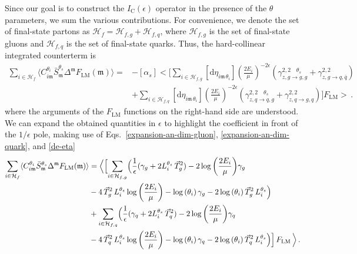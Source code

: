 \documentclass[a4paper, 12pt]{book}
\newcommand{\um}{\mathfrak{m}}
\begin{document}
Since our goal is to construct the $I_{\mathrm{C}}(\epsilon)$ operator in the presence of the $\theta$ parameters, we sum the various contributions. For convenience, we denote the set of final-state partons as $\mathcal{H}_f = \mathcal{H}_{f,g} + \mathcal{H}_{f,q}$, where $\mathcal{H}_{f,g}$ is the set of final-state gluons and $\mathcal{H}_{f,q}$ is the set of final-state quarks. Thus, the hard-collinear integrated counterterm is
\begin{equation}
  \begin{aligned}
     \sum_{i \in \mathcal{H}_f} \langle C_{i\mathfrak{m}}^{\theta_i} \bar{S}_{\mathfrak{m}}^{\theta_s} \Delta^{\mathfrak{m}} F_{\mathrm{LM}}(\mathfrak{m})\rangle =& - [\alpha_s] \biggl< \Biggl[ \sum_{i \in \mathcal{H}_{f,g}} [\mathrm{d}\eta_{i\um \, \theta_i}] \left(\frac{2E_i}{\mu}\right)^{-2\epsilon}(\gamma^{2,2 \quad \theta_s}_{z,g \to g, g}+ \gamma^{2,2}_{z,g \to q, \bar{q}}) \\
     & + \sum_{i \in \mathcal{H}_{f,q}} [\mathrm{d}\eta_{i\um \, \theta_i}] \left(\frac{2E_i}{\mu}\right)^{-2\epsilon}(\gamma^{2,2 \quad \theta_s}_{z,q \to q, g}+ \gamma^{2,2}_{z,q \to g, q}) \Biggr] F_{\mathrm{LM}} \biggr> \, .
  \end{aligned}
\end{equation}
where the arguments of the $F_{\mathrm{LM}}$ functions on the right-hand side are understood. We can expand the obtained quantities in $\epsilon$ to highlight the coefficient in front of the $1/\epsilon$ pole, making use of Eqs.~\ref{expansion-an-dim-gluon}, \ref{expansion-an-dim-quark}, and \ref{de-eta}
\begin{equation}
  \begin{aligned}
     \sum_{i \in \mathcal{H}_f} \langle C_{i\mathfrak{m}}^{\theta_i} \bar{S}_{\mathfrak{m}}^{\theta_s} \Delta^{\mathfrak{m}} F_{\mathrm{LM}}(\mathfrak{m})\rangle &= \Bigl<  \Bigl[\sum_{i \in \mathcal{H}_{f,g}} \Bigl( \frac{1}{\epsilon}(\gamma_g +  2 L_i^{\theta_s} \,\vec{T}_g^2) - 2 \log{\left(\frac{2E_i}{\mu}\right)}\gamma_g \\
      & - 4 \, \vec{T}_g^2 \, L_i^{\theta_s} \log{\left(\frac{2E_i}{\mu}\right)} - \log{(\theta_i)} \, \gamma_g - 2 \log{(\theta_i)} \, \vec{T}_g^2 \, L_i^{\theta_s}  \Bigr) \\
      & +\sum_{i \in \mathcal{H}_{f,q}} \Bigl( \frac{1}{\epsilon}(\gamma_q+  2 L_i^{\theta_s} \,\vec{T}_q^2) - 2 \log{\left(\frac{2E_i}{\mu}\right)}\gamma_q\\
      & - 4 \, \vec{T}_q^2 \, L_i^{\theta_s} \log{\left(\frac{2E_i}{\mu}\right)} - \log{(\theta_i)} \, \gamma_q - 2 \log{(\theta_i)} \, \vec{T}_q^2 \, L_i^{\theta_s}  \Bigr)  \Bigr]\, F_{\mathrm{LM}} \, \Bigr > \, .
  \end{aligned}
\end{equation}
\end{document}
